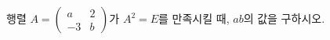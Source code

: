 \hspace*{2mm}\begin{minipage}[t]{\dimexpr\linewidth-2mm\relax}\vspace{0pt}
행렬 $A=\begin{pmatrix} a & 2 \\ -3 & b \end{pmatrix}$가 $A^2=E$를 만족시킬 때, $ab$의 값을 구하시오. \end{minipage}
